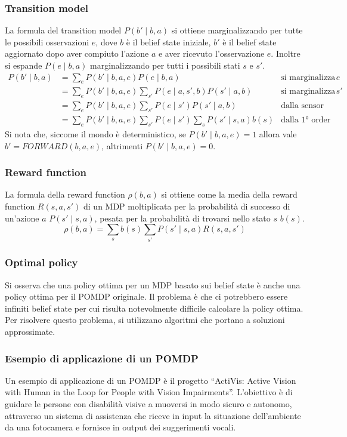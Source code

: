 \subsubsection*{Transition model}
La formula del transition model \(P(b' \mid b, a)\) si ottiene marginalizzando per tutte le possibili osservazioni \(e\),
dove \(b\) è il belief state iniziale, \(b'\) è il belief state aggiornato dopo aver compiuto l'azione \(a\) e aver ricevuto
l'osservazione \(e\). Inoltre si espande \(P(e \mid b, a)\) marginalizzando per tutti i possibili stati \(s\) e \(s'\).
\begin{align*}
	P(b' \mid b, a) &= \sum_e P(b' \mid b, a, e) P(e \mid b, a) & \text{si marginalizza per \(e\)} \\
	&= \sum_e P(b' \mid b, a, e) \sum_{s'} P(e \mid a, s', b) P(s' \mid a, b) & \text{si marginalizza per \(s'\)} \\
	&= \sum_e P(b' \mid b, a, e) \sum_{s'} P(e \mid s') P(s' \mid a, b) & \text{dalla sensor Markov assumption} \\
	&= \sum_e P(b' \mid b, a, e) \sum_{s'} P(e \mid s') \sum_s P(s' \mid s, a) b(s) & \text{dalla 1° order Markov assumption}
\end{align*}
Si nota che, siccome il mondo è deterministico, se \(P(b' \mid b, a, e) = 1\) allora vale \(b' = \textit{FORWARD}(b, a, e)\), 
altrimenti \(P(b' \mid b, a, e) = 0\).

\subsubsection*{Reward function}
La formula della reward function \(\rho(b, a)\) si ottiene come la media della reward function \(R(s,a,s')\) di un MDP
moltiplicata per la probabilità di successo di un'azione \(a\) \(P(s' \mid s, a)\), pesata per la probabilità di trovarsi
nello stato \(s\) \(b(s)\).
\[\rho(b, a) = \sum_s b(s) \sum_{s'} P(s' \mid s, a) R(s,a,s')\]

\subsubsection*{Optimal policy}
Si osserva che una policy ottima per un MDP basato sui belief state è anche una policy ottima per il POMDP originale. Il
problema è che ci potrebbero essere infiniti belief state per cui risulta notevolmente difficile calcolare la policy ottima.
Per risolvere questo problema, si utilizzano algoritmi che portano a soluzioni approssimate.

\subsubsection*{Esempio di applicazione di un POMDP}
Un esempio di applicazione di un POMDP è il progetto ``ActiVis: Active Vision with Human in the Loop for People with Vision
Impairments''. L'obiettivo è di guidare le persone con disabilità visive a muoversi in modo sicuro e autonomo, attraverso un
sistema di assistenza che riceve in input la situazione dell'ambiente da una fotocamera e fornisce in output dei suggerimenti
vocali.

